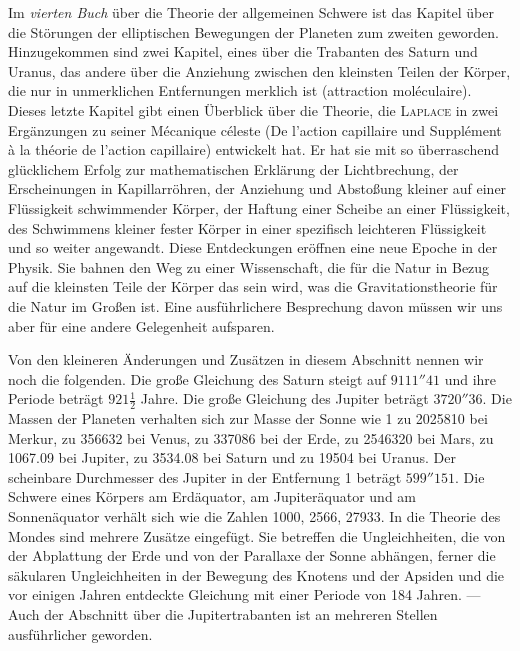 Im \emph{vierten Buch} über die Theorie der allgemeinen Schwere ist das Kapitel über die Störungen der elliptischen Bewegungen der Planeten zum zweiten geworden. Hinzugekommen sind zwei Kapitel, eines über die Trabanten des Saturn und Uranus, das andere über die Anziehung zwischen den kleinsten Teilen der Körper, die nur in unmerklichen Entfernungen merklich ist (attraction moléculaire). Dieses letzte Kapitel gibt einen Überblick über die Theorie, die \textsc{Laplace} in zwei Ergänzungen zu seiner Mécanique céleste (De l'action capillaire und Supplément à la théorie de l'action capillaire) entwickelt hat. Er hat sie mit so überraschend glücklichem Erfolg zur mathematischen Erklärung der Lichtbrechung, der Erscheinungen in Kapillarröhren, der Anziehung und Abstoßung kleiner auf einer Flüssigkeit schwimmender Körper, der Haftung einer Scheibe an einer Flüssigkeit, des Schwimmens kleiner fester Körper in einer spezifisch leichteren Flüssigkeit und so weiter angewandt. Diese Entdeckungen eröffnen eine neue Epoche in der Physik. Sie bahnen den Weg zu einer Wissenschaft, die für die Natur in Bezug auf die kleinsten Teile der Körper das sein wird, was die Gravitationstheorie für die Natur im Großen ist. Eine ausführlichere Besprechung davon müssen wir uns aber für eine andere Gelegenheit aufsparen.

Von den kleineren Änderungen und Zusätzen in diesem Abschnitt nennen wir noch die folgenden. Die große Gleichung des Saturn steigt auf $9111''41$ und ihre Periode beträgt $921\frac{1}{2}$ Jahre. Die große Gleichung des Jupiter beträgt $3720''36$. Die Massen der Planeten verhalten sich zur Masse der Sonne wie 1 zu 2025810 bei Merkur, zu 356632 bei Venus, zu 337086 bei der Erde, zu 2546320 bei Mars, zu 1067.09 bei Jupiter, zu 3534.08 bei Saturn und zu 19504 bei Uranus. Der scheinbare Durchmesser des Jupiter in der Entfernung 1 beträgt $599''151$. Die Schwere eines Körpers am Erdäquator, am Jupiteräquator und am Sonnenäquator verhält sich wie die Zahlen 1000, 2566, 27933. In die Theorie des Mondes sind mehrere Zusätze eingefügt. Sie betreffen die Ungleichheiten, die von der Abplattung der Erde und von der Parallaxe der Sonne abhängen, ferner die säkularen Ungleichheiten in der Bewegung des Knotens und der Apsiden und die vor einigen Jahren entdeckte Gleichung mit einer Periode von 184 Jahren. --- Auch der Abschnitt über die Jupitertrabanten ist an mehreren Stellen ausführlicher geworden.

